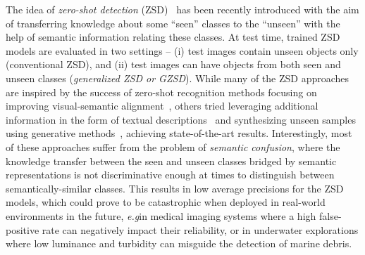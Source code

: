\documentclass{bmvc2k}
\def\eg{\emph{e.g}\bmvaOneDot}
\begin{document}
The idea of {\em zero-shot detection} (ZSD)~\cite{Demirel2018ZeroShotOD, rahman2018zero, bansal2018zero, zhu2019zero} has been recently introduced with the aim of transferring knowledge about some ``seen'' classes to the ``unseen'' with the help of semantic information relating these classes. At test time, trained ZSD models are evaluated in two settings -- (i) test images contain unseen objects only (conventional ZSD), and (ii) test images can have objects from both seen and unseen classes ({\em generalized ZSD or GZSD}). While many of the ZSD approaches are inspired by the success of zero-shot recognition methods focusing on improving visual-semantic alignment~\cite{bansal2018zero, rahman2018zero, Demirel2018ZeroShotOD, rahman2018polarity, mao2020zero}, others tried leveraging additional information in the form of textual descriptions~\cite{li2019zero} and synthesizing unseen samples using generative methods~\cite{zhao2020gtnet, zhu2020don, hayat2020synthesizing}, achieving state-of-the-art results. Interestingly, most of these approaches suffer from the problem of {\em semantic confusion}, where the knowledge transfer between the seen and unseen classes bridged by semantic representations is not discriminative enough at times to distinguish between semantically-similar classes. This results in low average precisions for the ZSD models, which could prove to be catastrophic when deployed in real-world environments in the future, \eg in medical imaging systems where a high false-positive rate can negatively impact their reliability, or in underwater explorations where low luminance and turbidity can misguide the detection of marine debris.     
\end{document}
